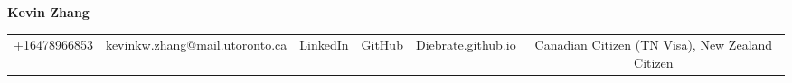 \documentclass{article}
\begin{document}
    \fontsize{9}{15}
    \selectfont
    \begin{center}
        \begin{center}
            \huge\bfseries Kevin Zhang
        \end{center}
            \begin{tabular}{c|c|c|c|c|c}
                \href{tel:+16478966853}{+16478966853} &
                \href{mailto:kevinkw.zhang@mail.utoronto.ca}{kevinkw.zhang@mail.utoronto.ca} & 
                \href{https://www.linkedin.com/in/kevin-zhang-uoft/}{LinkedIn} & 
                \href{https://github.com/diebrate/}{GitHub} &
                \href{https://diebrate.github.io/}{Diebrate.github.io} &
                Canadian Citizen (TN Visa), New Zealand Citizen
        \end{tabular}
    \end{center}    
    \vspace{-0.75em}
    
    
    
    
    
    
  
\end{document}
